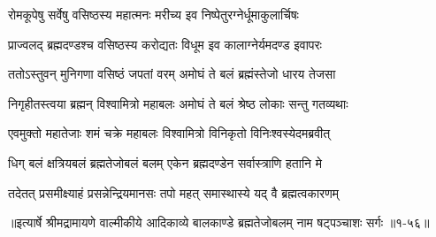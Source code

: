 \twolineshloka
{रोमकूपेषु सर्वेषु वसिष्ठस्य महात्मनः}
{मरीच्य इव निष्पेतुरग्नेर्धूमाकुलार्चिषः} %

\twolineshloka
{प्राज्वलद् ब्रह्मदण्डश्च वसिष्ठस्य करोद्यतः}
{विधूम इव कालाग्नेर्यमदण्ड इवापरः} %

\twolineshloka
{ततोऽस्तुवन् मुनिगणा वसिष्ठं जपतां वरम्}
{अमोघं ते बलं ब्रह्मंस्तेजो धारय तेजसा} %

\twolineshloka
{निगृहीतस्त्वया ब्रह्मन् विश्वामित्रो महाबलः}
{अमोघं ते बलं श्रेष्ठ लोकाः सन्तु गतव्यथाः} %

\twolineshloka
{एवमुक्तो महातेजाः शमं चक्रे महाबलः}
{विश्वामित्रो विनिकृतो विनिःश्वस्येदमब्रवीत्} %

\twolineshloka
{धिग् बलं क्षत्रियबलं ब्रह्मतेजोबलं बलम्}
{एकेन ब्रह्मदण्डेन सर्वास्त्राणि हतानि मे} %

\twolineshloka
{तदेतत् प्रसमीक्ष्याहं प्रसन्नेन्द्रियमानसः}
{तपो महत् समास्थास्ये यद् वै ब्रह्मत्वकारणम्} %


॥इत्यार्षे श्रीमद्रामायणे वाल्मीकीये आदिकाव्ये बालकाण्डे ब्रह्मतेजोबलम् नाम षट्पञ्चाशः सर्गः ॥१-५६॥
